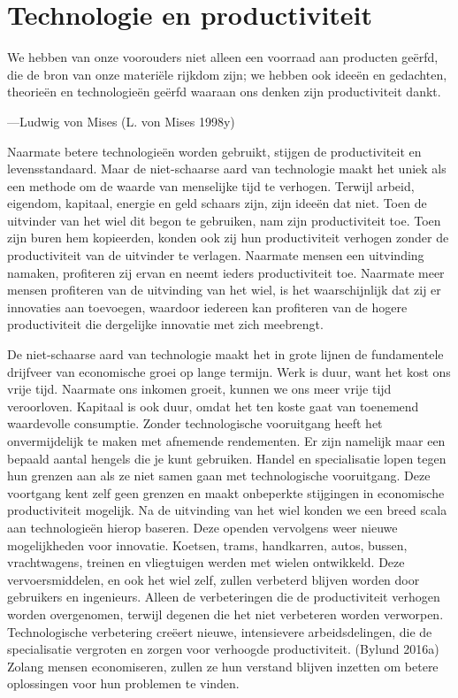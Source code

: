 \documentclass[
  a5paper,
  smalldemyvopaper,11pt,twoside,onecolumn,openright,extrafontsizes,
hidelinks]{memoir}
\begin{document}
\section{Technologie en
productiviteit}\label{technologie-en-productiviteit}

We hebben van onze voorouders niet alleen een voorraad aan producten
geërfd, die de bron van onze materiële rijkdom zijn; we hebben ook
ideeën en gedachten, theorieën en technologieën geërfd waaraan ons
denken zijn productiviteit dankt.

---Ludwig von Mises (L. von Mises 1998y)

Naarmate betere technologieën worden gebruikt, stijgen de productiviteit
en levensstandaard. Maar de niet-schaarse aard van technologie maakt het
uniek als een methode om de waarde van menselijke tijd te verhogen.
Terwijl arbeid, eigendom, kapitaal, energie en geld schaars zijn, zijn
ideeën dat niet. Toen de uitvinder van het wiel dit begon te gebruiken,
nam zijn productiviteit toe. Toen zijn buren hem kopieerden, konden ook
zij hun productiviteit verhogen zonder de productiviteit van de
uitvinder te verlagen. Naarmate mensen een uitvinding namaken,
profiteren zij ervan en neemt ieders productiviteit toe. Naarmate meer
mensen profiteren van de uitvinding van het wiel, is het waarschijnlijk
dat zij er innovaties aan toevoegen, waardoor iedereen kan profiteren
van de hogere productiviteit die dergelijke innovatie met zich
meebrengt.

De niet-schaarse aard van technologie maakt het in grote lijnen de
fundamentele drijfveer van economische groei op lange termijn. Werk is
duur, want het kost ons vrije tijd. Naarmate ons inkomen groeit, kunnen
we ons meer vrije tijd veroorloven. Kapitaal is ook duur, omdat het ten
koste gaat van toenemend waardevolle consumptie. Zonder technologische
vooruitgang heeft het onvermijdelijk te maken met afnemende rendementen.
Er zijn namelijk maar een bepaald aantal hengels die je kunt gebruiken.
Handel en specialisatie lopen tegen hun grenzen aan als ze niet samen
gaan met technologische vooruitgang. Deze voortgang kent zelf geen
grenzen en maakt onbeperkte stijgingen in economische productiviteit
mogelijk. Na de uitvinding van het wiel konden we een breed scala aan
technologieën hierop baseren. Deze openden vervolgens weer nieuwe
mogelijkheden voor innovatie. Koetsen, trams, handkarren, autos, bussen,
vrachtwagens, treinen en vliegtuigen werden met wielen ontwikkeld. Deze
vervoersmiddelen, en ook het wiel zelf, zullen verbeterd blijven worden
door gebruikers en ingenieurs. Alleen de verbeteringen die de
productiviteit verhogen worden overgenomen, terwijl degenen die het niet
verbeteren worden verworpen. Technologische verbetering creëert nieuwe,
intensievere arbeidsdelingen, die de specialisatie vergroten en zorgen
voor verhoogde productiviteit. (Bylund 2016a) Zolang mensen
economiseren, zullen ze hun verstand blijven inzetten om betere
oplossingen voor hun problemen te vinden.
\end{document}
